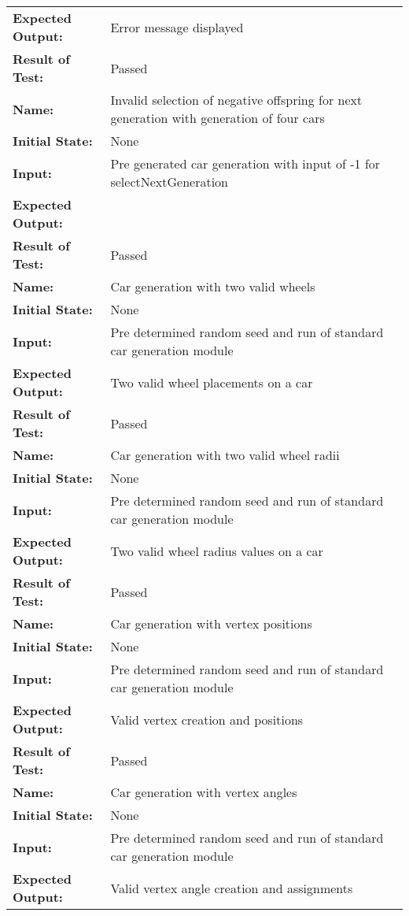 \documentclass[12pt, titlepage]{article}
\begin{document}
\begin{center}
\begin{longtable}{ l | p{10cm} }
\textbf{Expected Output:} & Error message displayed\\[0.6em]
\textbf{Result of Test:} & Passed\\
\hline
\rule{0pt}{1.5em}\textbf{Name:} & Invalid selection of negative offspring for 
next generation with generation of four cars\\
\textbf{Initial State:} & None\\
\textbf{Input:} & Pre generated car generation with input of -1 for 
selectNextGeneration\\
\textbf{Expected Output:} & \\[0.6em]
\textbf{Result of Test:} & Passed\\
\hline
\rule{0pt}{1.5em}\textbf{Name:} & Car generation with two valid wheels\\
\textbf{Initial State:} & None\\
\textbf{Input:} & Pre determined random seed and run of standard car generation 
module\\
\textbf{Expected Output:} & Two valid wheel placements on a car\\[0.6em]
\textbf{Result of Test:} & Passed\\
\hline
\rule{0pt}{1.5em}\textbf{Name:} & Car generation with two valid wheel radii\\
\textbf{Initial State:} & None\\
\textbf{Input:} & Pre determined random seed and run of standard car generation 
module\\
\textbf{Expected Output:} & Two valid wheel radius values on a car\\[0.6em]
\textbf{Result of Test:} & Passed\\
\hline
\rule{0pt}{1.5em}\textbf{Name:} & Car generation with vertex positions\\
\textbf{Initial State:} & None\\
\textbf{Input:} & Pre determined random seed and run of standard car generation 
module\\
\textbf{Expected Output:} & Valid vertex creation and positions\\[0.6em]
\textbf{Result of Test:} & Passed\\
\hline
\rule{0pt}{1.5em}\textbf{Name:} & Car generation with vertex angles\\
\textbf{Initial State:} & None\\
\textbf{Input:} & Pre determined random seed and run of standard car generation 
module\\
\textbf{Expected Output:} & Valid vertex angle creation and assignments\\[0.6em]

\end{longtable}
\end{center}
\end{document}
